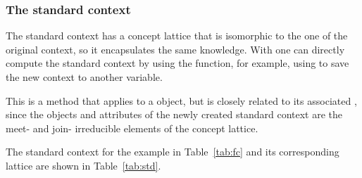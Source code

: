 \hypertarget{the-standard-context}{%
\subsubsection{The standard context}\label{the-standard-context}}

The standard context has a concept lattice that is isomorphic to the one
of the original context, so it encapsulates the same knowledge. With
 one can directly compute the standard context by using the
 function, for example, using
 to save the new context to another
variable.

This is a method that applies to a  object, but is
closely related to its associated , since the
objects and attributes of the newly created standard context are the
meet- and join- irreducible elements of the concept lattice.

The standard context for the example in Table~\ref{tab:fc} and its
corresponding lattice are shown in Table~\ref{tab:std}.

